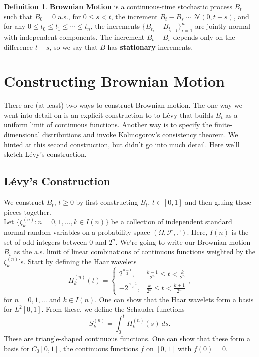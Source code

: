 \documentclass[11pt,letterpaper]{article}
\newcommand{\mcal}[1]{\mathcal{#1}}
\newcommand{\Prob}{\mathbb{P}}
\theoremstyle{plain}
\theoremstyle{definition}
\newtheorem{definition}[theorem]{Definition} %
\begin{document}
\begin{definition}
	\textbf{Brownian Motion} is a continuous-time stochastic process $B_t$ such that $B_0 = 0$ a.s., for $0\leq s<t$, the increment $B_t - B_s \sim \mcal{N}(0, t-s)$, and for any $0\leq t_0 \leq t_1 \leq \cdots \leq t_n$, the increments $\{B_{t_i} - B_{t_{i-1}}\}_{i=1}^n$ are jointly normal with independent components. The increment $B_t-B_s$ depends only on the difference $t-s$, so we say that $B$ has \textbf{stationary} increments.
\end{definition}

\section{Constructing Brownian Motion}
There are (at least) two ways to construct Brownian motion. The one way we went into detail on is an explicit construction to to L\'evy that builds $B_t$ as a uniform limit of continuous functions. Another way is to specify the finite-dimensional distributions and invoke Kolmogorov's consistency theorem. We hinted at this second construction, but didn't go into much detail. Here we'll sketch L\'evy's construction.

\subsection{L\'evy's Construction}
We construct $B_t$, $t\geq 0$ by first constructing $B_t$, $t\in [0,1]$ and then gluing these pieces together.\\

\noindent Let $\{\zeta_k^{(n)}: n = 0, 1, \ldots, k\in I(n)\}$ be a collection of independent standard normal random variables on a probability space $(\Omega, \mcal{F}, \Prob)$. Here, $I(n)$ is the set of odd integers between 0 and $2^n$. We're going to write our Brownian motion $B_t$ as the a.s. limit of linear combinations of continuous functions weighted by the $\zeta^{(n)}_k$'s. Start by defining the Haar wavelets
\[
H_k^{(n)}(t) = \begin{cases}
	2^{\frac{n-1}{2}},& \frac{k-1}{2^n}\leq t<\frac{k}{2^n}\\
	-2^{\frac{n-1}{2}},& \frac{k}{2^n}\leq t < \frac{k+1}{2^n}
\end{cases},
\]
for $n = 0, 1, \ldots$ and $k\in I(n)$. One can show that the Haar wavelets form a basis for $L^2[0,1]$. From these, we define the Schauder functions
\[
S_k^{(n)} = \int_0^tH_k^{(n)}(s)\ ds.
\]
These are triangle-shaped continuous functions. One can show that these form a basis for $C_0[0,1]$, the continuous functions $f$ on $[0,1]$ with $f(0) = 0$.\\
\end{document}
